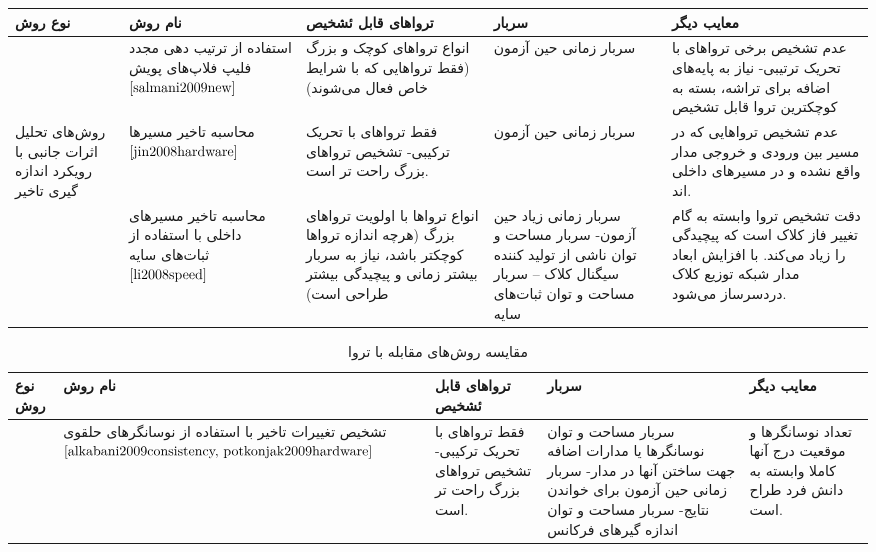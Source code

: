 \begin{table}
	\begin{tabular}{|p{1cm}||p{3cm}|p{3cm}|p{3cm}|p{3cm}|}
		نوع روش & نام روش & تروا‌های قابل ئشخیص & سربار& معایب دیگر \\ \hline \hline
		& استفاده از ترتیب دهی مجدد فلیپ فلاپ‌های پویش $\cite{salmani2009new}$ &انواع تروا‌های کوچک و بزرگ (فقط تروا‌هایی که با شرایط خاص فعال می‌شوند) &سربار زمانی حین آزمون & عدم تشخیص برخی تروا‌های با تحریک ترتیبی- نیاز به پایه‌‌های اضافه برای تراشه، بسته به کوچکترین تروا قابل تشخیص
		\\ \hline \hline
		روش‌ها‌‌ی تحلیل اثرات جانبی با رویکرد اندازه ‌گیری تاخیر& محاسبه تاخیر مسیرها $\cite{jin2008hardware}$ & فقط تروا‌های با تحریک ترکیبی- تشخیص تروا‌های بزرگ راحت تر است.& سربار زمانی حین آزمون&عدم تشخیص تروا‌هایی که در مسیر بین ورودی و خروجی مدار واقع نشده و در مسیرهای داخلی اند.
		\\ \cline{2-5}
		
		
		&محاسبه تاخیر مسیرهای داخلی با استفاده از ثبات‌های سایه $\cite{li2008speed}$ &انواع تروا‌ها با اولویت تروا‌های بزرگ (هرچه اندازه تروا‌ها کوچکتر باشد، نیاز به سربار بیشتر زمانی و پیچیدگی بیشتر طراحی است) &سربار زمانی زیاد حین آزمون- سربار مساحت و توان ناشی از تولید کننده سیگنال کلاک – سربار مساحت و توان ثبات‌های سایه &دقت تشخیص تروا وابسته به گام تغییر فاز کلاک است که پیچیدگی را زیاد می‌‌کند. با افزایش ابعاد مدار شبکه توزیع کلاک دردسرساز می‌شود.
	\end{tabular}
\end{table}
\newpage
\begin{table}
	\begin{tabular}{|p{1cm}||p{3cm}|p{3cm}|p{3cm}|p{3cm}|}
		نوع روش & نام روش & تروا‌های قابل ئشخیص & سربار& معایب دیگر \\ \hline \hline
		&تشخیص تغییرات تاخیر با استفاده از نوسانگرهای حلقوی
		$\cite{alkabani2009consistency, potkonjak2009hardware}$
		&فقط تروا‌های با تحریک ترکیبی- تشخیص تروا‌های بزرگ راحت تر است.&سربار مساحت و توان نوسانگرها یا مدارات اضافه جهت ساختن آنها در مدار- سربار زمانی حین آزمون برای خواندن نتایج- سربار مساحت و توان اندازه گیرهای فرکانس&تعداد نوسانگرها و موقعیت درج آنها کاملا وابسته به دانش فرد طراح است.
		\\ \hline \hline
	\end{tabular}
	\caption{مقایسه روش‌های مقابله با تروا}
\end{table}



